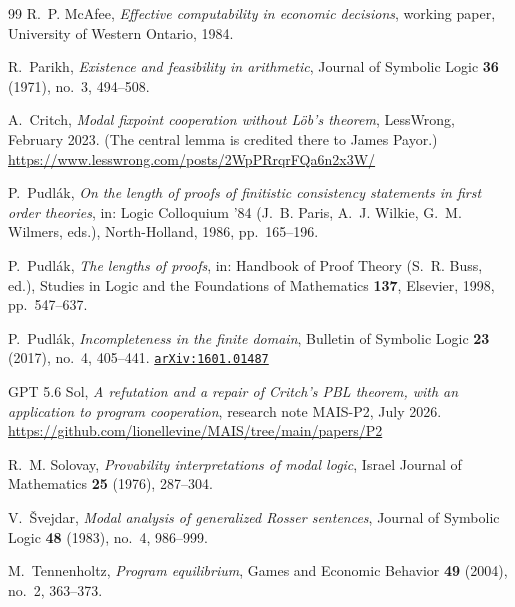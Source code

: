 \documentclass[11pt]{amsart}
\newcommand{\arxiv}[1]{\href{https://arxiv.org/abs/#1}{\texttt{arXiv:#1}}}
\theoremstyle{plain}
\theoremstyle{definition}
\begin{document}
\begin{thebibliography}{99}
R.~P. McAfee,
\emph{Effective computability in economic decisions},
working paper, University of Western Ontario, 1984.

R.~Parikh,
\emph{Existence and feasibility in arithmetic},
Journal of Symbolic Logic \textbf{36} (1971), no.~3, 494--508.

A.~Critch,
\emph{Modal fixpoint cooperation without L\"ob's theorem},
LessWrong, February 2023. (The central lemma is credited there to James Payor.)
\url{https://www.lesswrong.com/posts/2WpPRrqrFQa6n2x3W/}

P.~Pudl\'ak,
\emph{On the length of proofs of finitistic consistency statements in first order theories},
in: Logic Colloquium '84 (J.~B. Paris, A.~J. Wilkie, G.~M. Wilmers, eds.), North-Holland, 1986, pp.~165--196.

P.~Pudl\'ak,
\emph{The lengths of proofs},
in: Handbook of Proof Theory (S.~R. Buss, ed.), Studies in Logic and the Foundations of Mathematics \textbf{137}, Elsevier, 1998, pp.~547--637.

P.~Pudl\'ak,
\emph{Incompleteness in the finite domain},
Bulletin of Symbolic Logic \textbf{23} (2017), no.~4, 405--441. \arxiv{1601.01487}

GPT 5.6 Sol,
\emph{A refutation and a repair of Critch's PBL theorem, with an application to program cooperation},
research note MAIS-P2, July 2026.
\url{https://github.com/lionellevine/MAIS/tree/main/papers/P2}

R.~M. Solovay,
\emph{Provability interpretations of modal logic},
Israel Journal of Mathematics \textbf{25} (1976), 287--304.

V.~\v{S}vejdar,
\emph{Modal analysis of generalized Rosser sentences},
Journal of Symbolic Logic \textbf{48} (1983), no.~4, 986--999.

M.~Tennenholtz,
\emph{Program equilibrium},
Games and Economic Behavior \textbf{49} (2004), no.~2, 363--373.

\end{thebibliography}
\end{document}
